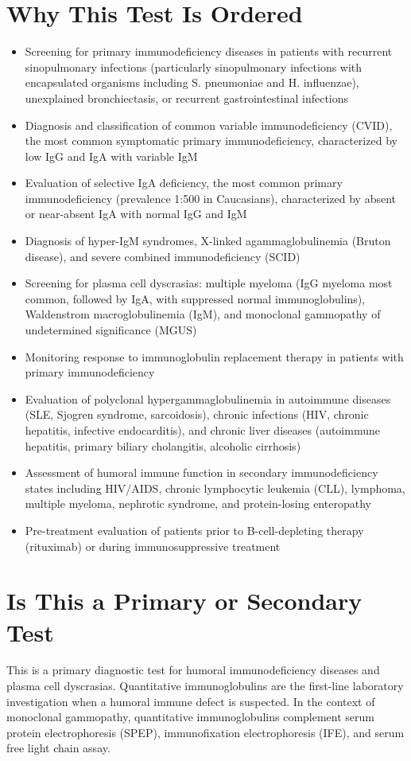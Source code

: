 \section*{Why This Test Is Ordered}
\begin{itemize}
  \item Screening for primary immunodeficiency diseases in patients with recurrent sinopulmonary infections (particularly sinopulmonary infections with encapsulated organisms including S. pneumoniae and H. influenzae), unexplained bronchiectasis, or recurrent gastrointestinal infections
  \item Diagnosis and classification of common variable immunodeficiency (CVID), the most common symptomatic primary immunodeficiency, characterized by low IgG and IgA with variable IgM
  \item Evaluation of selective IgA deficiency, the most common primary immunodeficiency (prevalence 1:500 in Caucasians), characterized by absent or near-absent IgA with normal IgG and IgM
  \item Diagnosis of hyper-IgM syndromes, X-linked agammaglobulinemia (Bruton disease), and severe combined immunodeficiency (SCID)
  \item Screening for plasma cell dyscrasias: multiple myeloma (IgG myeloma most common, followed by IgA, with suppressed normal immunoglobulins), Waldenstrom macroglobulinemia (IgM), and monoclonal gammopathy of undetermined significance (MGUS)
  \item Monitoring response to immunoglobulin replacement therapy in patients with primary immunodeficiency
  \item Evaluation of polyclonal hypergammaglobulinemia in autoimmune diseases (SLE, Sjogren syndrome, sarcoidosis), chronic infections (HIV, chronic hepatitis, infective endocarditis), and chronic liver diseases (autoimmune hepatitis, primary biliary cholangitis, alcoholic cirrhosis)
  \item Assessment of humoral immune function in secondary immunodeficiency states including HIV/AIDS, chronic lymphocytic leukemia (CLL), lymphoma, multiple myeloma, nephrotic syndrome, and protein-losing enteropathy
  \item Pre-treatment evaluation of patients prior to B-cell-depleting therapy (rituximab) or during immunosuppressive treatment
\end{itemize}

\section*{Is This a Primary or Secondary Test}
This is a primary diagnostic test for humoral immunodeficiency diseases and plasma cell dyscrasias. Quantitative immunoglobulins are the first-line laboratory investigation when a humoral immune defect is suspected. In the context of monoclonal gammopathy, quantitative immunoglobulins complement serum protein electrophoresis (SPEP), immunofixation electrophoresis (IFE), and serum free light chain assay.

